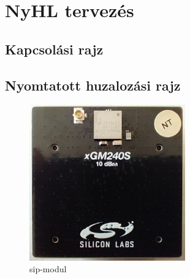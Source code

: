 \documentclass[a4paper,12pt,titlepage]{article}
\begin{document}
    \section{NyHL tervezés}
        \subsection{Kapcsolási rajz}
        \subsection{Nyomtatott huzalozási rajz}
            \begin{figure}
                \centering
                \includegraphics[width=0.6\textwidth]{kep/szerkesztett/sip-modul.jpg}
                \caption{sip-modul}
                \label{fig:sip}
            \end{figure}
%
%
\end{document}

